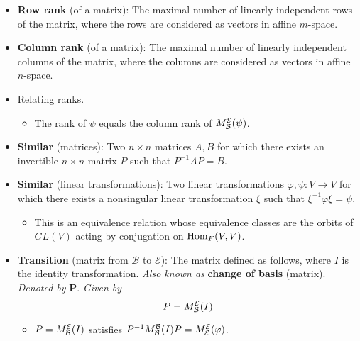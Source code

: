 \documentclass[../notes.tex]{subfiles}
\begin{document}
\begin{itemize}
\begin{corollary}
\begin{enumerate}
            \item $GL(V)\cong GL_n(F)$, where $\dim V=n$. In particular, if $F$ is a finite field, the order of the finite group $GL_n(F)$ (which equals $|GL(V)|$) is given by the formula at the end of Section 11.1.
        \end{enumerate}
        \begin{proof}
            Given.
        \end{proof}
    \end{corollary}
    \item \textbf{Row rank} (of a matrix): The maximal number of linearly independent rows of the matrix, where the rows are considered as vectors in affine $m$-space.
    \item \textbf{Column rank} (of a matrix): The maximal number of linearly independent columns of the matrix, where the columns are considered as vectors in affine $n$-space.
    \item Relating ranks.
    \begin{itemize}
        \item The rank of $\psi$ equals the column rank of $M_\mathcal{B}^\mathcal{E}(\psi)$.
    \end{itemize}
    \item \textbf{Similar} (matrices): Two $n\times n$ matrices $A,B$ for which there exists an invertible $n\times n$ matrix $P$ such that $P^{-1}AP=B$.
    \item \textbf{Similar} (linear transformations): Two linear transformations $\varphi,\psi:V\to V$ for which there exists a nonsingular linear transformation $\xi$ such that $\xi^{-1}\varphi\xi=\psi$.
    \begin{itemize}
        \item This is an equivalence relation whose equivalence classes are the orbits of $GL(V)$ acting by conjugation on $\operatorname{Hom}_F(V,V)$.
    \end{itemize}
    \item \textbf{Transition} (matrix from $\mathcal{B}$ to $\mathcal{E}$): The matrix defined as follows, where $I$ is the identity transformation. \emph{Also known as} \textbf{change of basis} (matrix). \emph{Denoted by} $\bm{P}$. \emph{Given by}
    \begin{equation*}
        P = M_\mathcal{B}^\mathcal{E}(I)
    \end{equation*}
    \begin{itemize}
        \item $P=M_\mathcal{B}^\mathcal{E}(I)$ satisfies $P^{-1}M_\mathcal{B}^\mathcal{B}(I)P=M_\mathcal{E}^\mathcal{E}(\varphi)$.

\end{itemize}
\end{itemize}
\end{document}
